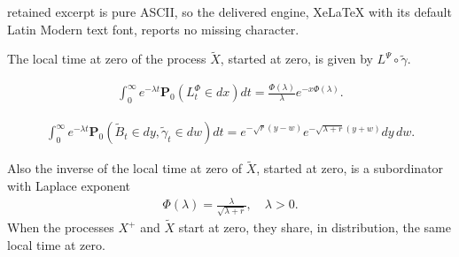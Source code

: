 \documentclass[10pt,a4paper]{amsart}
\begin{document}
retained excerpt is pure ASCII, so the delivered engine, XeLaTeX with its default Latin Modern text font, reports no missing character.
\begin{theorem}
	\label{tm:local-time-pallino}
	The local time at zero of the process $\widetilde{X}$, started at zero, is given by $L^\Psi \circ \widetilde{\gamma}$.
\end{theorem}

	\begin{align}
		\label{symbol:L}
		\int_{0}^\infty e^{-\lambda t} \mathbf{P}_0 (L_t^\Phi \in dx) dt = \frac{\Phi(\lambda)}{\lambda} e^{-x\Phi(\lambda)}.
	\end{align}

	\begin{align}
		\label{drift:joint}
		\int_0^\infty e^{-\lambda t} \mathbf{P}_0(\widetilde{B}_t \in dy, \widetilde{\gamma}_t \in dw) dt = e^{-\sqrt{r} (y-w)} e^{- \sqrt{\lambda + r}(y+w) } dy \, dw.
	\end{align}

\begin{theorem}
	\label{tm:same-local-times}
	Also the inverse of the local time at zero of $\widetilde{X}$, started at zero, is a subordinator with Laplace exponent
	\begin{align*}
		\Phi(\lambda)=\frac{\lambda}{\sqrt{\lambda + r}}, \quad \lambda >0.
	\end{align*}
	When the processes \(X^+\) and \(\widetilde{X}\) start at zero, they share, in distribution, the same local time at zero.
\end{theorem}
\end{document}
